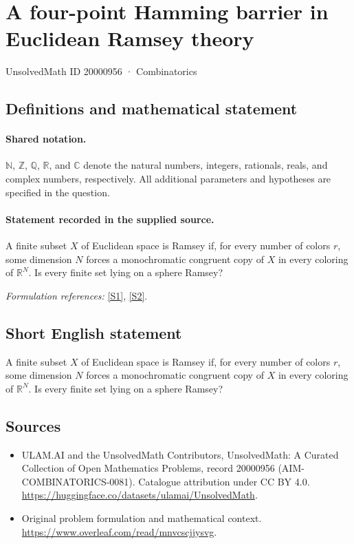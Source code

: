 \documentclass[11pt]{article}
\newcommand{\sref}[2]{\hyperlink{source:#1:#2}{[S#2]}}
\begin{document}
\setcounter{section}{20000955}
\section{A four-point Hamming barrier in Euclidean Ramsey theory}\label{20000956}
{\small UnsolvedMath ID 20000956 · Combinatorics}
\subsection{Definitions and mathematical statement}

\paragraph{Shared notation.}$\mathbb N$, $\mathbb Z$, $\mathbb Q$, $\mathbb R$, and $\mathbb C$ denote the natural numbers, integers, rationals, reals, and complex numbers, respectively. All additional parameters and hypotheses are specified in the question.


\paragraph{Statement recorded in the supplied source.}
A finite subset $X$ of Euclidean space is Ramsey if, for every number of colors $r$, some dimension $N$ forces a monochromatic congruent copy of $X$ in every coloring of $\mathbb R^N$. Is every finite set lying on a sphere Ramsey?
\par\smallskip\textit{Formulation references:} \sref{20000956}{1}, \sref{20000956}{2}.
\subsection{Short English statement}
A finite subset $X$ of Euclidean space is Ramsey if, for every number of colors $r$, some dimension $N$ forces a monochromatic congruent copy of $X$ in every coloring of $\mathbb R^N$. Is every finite set lying on a sphere Ramsey?
\subsection{Sources}
\begin{itemize}
\item[\hypertarget{source:20000956:1}{S1}] ULAM.AI and the UnsolvedMath Contributors, UnsolvedMath: A Curated Collection of Open Mathematics Problems, record 20000956 (AIM-COMBINATORICS-0081). Catalogue attribution under CC BY 4.0.
\url{https://huggingface.co/datasets/ulamai/UnsolvedMath}.
\item[\hypertarget{source:20000956:2}{S2}] Original problem formulation and mathematical context.
\url{https://www.overleaf.com/read/mnvcscjjysvg}.
\end{itemize}
\label{end:20000956}
\end{document}
